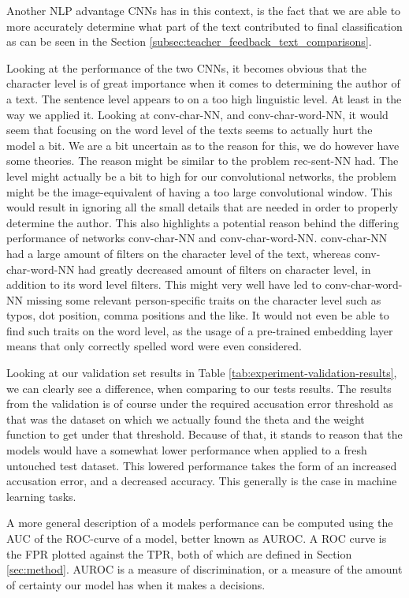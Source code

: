 Another \gls{NLP} advantage \glspl{CNN} has in this context, is the
fact that we are able to more accurately determine what part of the
text contributed to final classification as can be seen in the Section
\ref{subsec:teacher_feedback_text_comparisons}.

Looking at the performance of the two \glspl{CNN}, it becomes obvious that
the character level is of great importance when it comes to determining the
author of a text. The sentence level appears to on a too high linguistic
level. At least in the way we applied it. Looking at \gls{conv-char-NN}, and
\gls{conv-char-word-NN}, it would seem that focusing on the word level of the
texts seems to actually hurt the model a bit. We are a bit uncertain as to the
reason for this, we do however have some theories. The reason might be similar
to the problem \gls{rec-sent-NN} had. The level might actually be a bit to
high for our convolutional networks, the problem might be the image-equivalent
of having a too large convolutional window. This would result in ignoring all
the small details that are needed in order to properly determine the author.
This also highlights a potential reason behind the differing performance of
networks \gls{conv-char-NN} and \gls{conv-char-word-NN}. \gls{conv-char-NN}
had a large amount of filters on the character level of the text, whereas
\gls{conv-char-word-NN} had greatly decreased amount of filters on character
level, in addition to its word level filters. This might very well have led to
\gls{conv-char-word-NN} missing some relevant person-specific traits on the
character level such as typos, dot position, comma positions and the like. It
would not even be able to find such traits on the word level, as the usage of
a pre-trained embedding layer means that only correctly spelled word were even
considered.

Looking at our validation set results in Table
\ref{tab:experiment-validation-results}, we can clearly see a difference, when
comparing to our tests results. The results from the validation is of course
under the required accusation error threshold as that was the dataset on which
we actually found the theta and the weight function to get under that threshold.
Because of that, it stands to reason that the models would have a somewhat
lower performance when applied to a fresh untouched test dataset. This lowered
performance takes the form of an increased accusation error, and a decreased
accuracy. This generally is the case in machine learning tasks.

A more general description of a models performance can be computed using the
\gls{AUC} of the \gls{ROC}-curve of a model, better known as \gls{AUROC}.
A \gls{ROC} curve is the \gls{FPR} plotted against the \gls{TPR}, both of
which are defined in Section \ref{sec:method}. \gls{AUROC} is a measure of
discrimination, or a measure of the amount of certainty our model has when it
makes a decisions.

